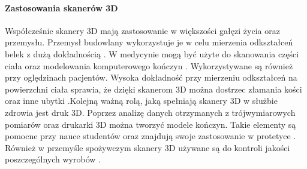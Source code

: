 \documentclass[10pt]{article}
\begin{document}
\paragraph{Zastosowania skanerów 3D\newline}

Współcześnie skanery 3D mają zastosowanie w większości gałęzi życia oraz przemysłu. Przemysł budowlany wykorzystuje je w celu mierzenia odkształceń belek z dużą dokładnością \cite{goszczynska2014doswiadczalna}. W medycynie mogą być użyte do skanowania części ciała oraz modelowania komputerowego kończyn \cite{tomaka20053d}. Wykorzystywane są również przy oględzinach pacjentów. Wysoka dokładność przy mierzeniu odkształceń na powierzchni ciała sprawia, że dzięki skanerom 3D można dostrzec złamania kości oraz inne ubytki \cite{thali2003optical}.Kolejną ważną rolą, jaką spełniają skanery 3D w służbie zdrowia jest druk 3D. Poprzez analizę danych otrzymanych z trójwymiarowych pomiarów oraz drukarki 3D można tworzyć modele kończyn. Takie elementy są pomocne przy nauce studentów oraz znajdują swoje zastosowanie w protetyce \cite{mcmenamin2014production}. Również w przemyśle spożywczym skanery 3D używane są do kontroli jakości poszczególnych wyrobów \cite{anders2012zastosowanie}.



\end{document}
